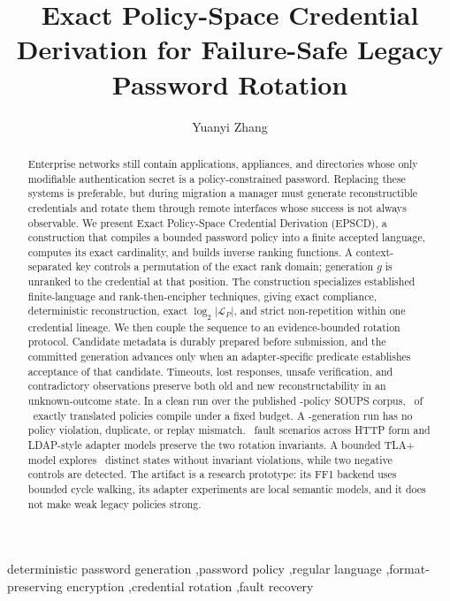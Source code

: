 \documentclass[preprint,12pt]{elsarticle}
\newcommand{\Lang}{\mathcal{L}}
\begin{document}
\begin{frontmatter}

\title{Exact Policy-Space Credential Derivation for Failure-Safe Legacy Password Rotation}

\author{Yuanyi Zhang}
\address{Independent Researcher}

\begin{abstract}
Enterprise networks still contain applications, appliances, and directories
whose only modifiable authentication secret is a policy-constrained password.
Replacing these systems is preferable, but during migration a manager must
generate reconstructible credentials and rotate them through remote interfaces
whose success is not always observable. We present Exact Policy-Space
Credential Derivation (EPSCD), a construction that compiles a bounded password
policy into a finite accepted language, computes its exact cardinality, and
builds inverse ranking functions. A context-separated key controls a
permutation of the exact rank domain; generation $g$ is unranked to the
credential at that position. The construction specializes established
finite-language and rank-then-encipher techniques, giving exact compliance,
deterministic reconstruction, exact $\log_2|\Lang_P|$, and strict
non-repetition within one credential lineage. We then couple the sequence to an
evidence-bounded rotation protocol. Candidate metadata is durably prepared
before submission, and the committed generation advances only when an
adapter-specific predicate establishes acceptance of that candidate. Timeouts,
lost responses, unsafe verification, and contradictory observations preserve
both old and new reconstructability in an unknown-outcome state. In a clean run
over the published \CorpusTotal-policy SOUPS corpus, \CorpusCompiled\ of
\CorpusTranslated\ exactly translated policies compile under a fixed budget.
A \SequenceCount-generation run has no policy
violation, duplicate, or replay mismatch. \RotationCases\ fault scenarios across HTTP
form and LDAP-style adapter models preserve the two rotation invariants. A
bounded TLA+ model explores \TlaDistinctStates\ distinct states without invariant violations,
while two negative controls are detected. The artifact is a research prototype:
its FF1 backend uses bounded cycle walking, its adapter experiments are local
semantic models, and it does not make weak legacy policies strong.
\end{abstract}

\begin{keyword}
deterministic password generation \sep password policy \sep regular language
\sep format-preserving encryption \sep credential rotation \sep fault recovery
\end{keyword}

\end{frontmatter}
\end{document}

